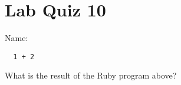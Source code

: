 \documentclass{article}
\begin{document}
\section*{Lab Quiz 10}

\bigskip
\bigskip
Name: \underline{\hspace*{4in}}

\bigskip
\setlength{\parskip}{8pt}

\begin{verbatim}
  1 + 2
\end{verbatim}

\bigskip

What is the result of the Ruby program above?
\end{document}
